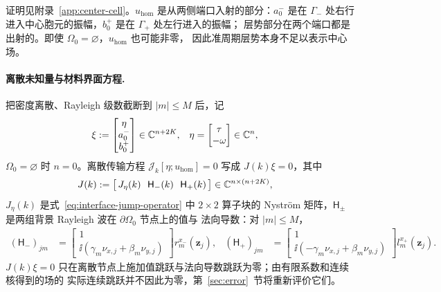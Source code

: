 证明见附录~\ref{app:center-cell}。$u_{\mathrm{hom}}$ 是从两侧端口入射的部分：$a^-_0$
是在 $\Gamma_-$ 处右行进入中心胞元的振幅，$b^+_0$ 是在 $\Gamma_+$ 处左行进入的振幅；
层势部分在两个端口都是出射的。即使 $\Omega_0=\varnothing$，$u_{\mathrm{hom}}$ 也可能非零，
因此准周期层势本身不足以表示中心场。

\paragraph{离散未知量与材料界面方程.}
把密度离散、Rayleigh 级数截断到 $|m|\leq M$ 后，记
\begin{align}
  \xi&:=\begin{bmatrix}\eta\\ a^-_0\\ b^+_0\end{bmatrix}\in\mathbb{C}^{n+2K},
  &\eta&=\begin{bmatrix}\tau\\-\omega\end{bmatrix}\in\mathbb{C}^n,
  \label{eq:center-unknown}
\end{align}
$\Omega_0=\varnothing$ 时 $n=0$。离散传输方程
$\mathscr J_k[\eta;u_{\mathrm{hom}}]=0$ 写成 $J(k)\xi=0$，其中
\begin{align}
  J(k)&:=\bigl[\,J_\eta(k)\ \ \mathsf H_-(k)\ \ \mathsf H_+(k)\,\bigr]
  \in\mathbb{C}^{n\times(n+2K)},
  \label{eq:center-interface-matrix}
\end{align}
$J_\eta(k)$ 是式~\eqref{eq:interface-jump-operator} 中 $2\times2$ 算子块的
Nystr\"om 矩阵，$\mathsf H_\pm$ 是两组背景 Rayleigh 波在 $\partial\Omega_0$ 节点上的值与
法向导数：对 $|m|\leq M$，
\begin{align}
  (\mathsf H_-)_{jm}
  &=\begin{bmatrix}1\\ \ii(\gamma_m\nu_{x,j}+\beta_m\nu_{y,j})\end{bmatrix}
    r_m^{x_-}(\mathbf z_j),
  &(\mathsf H_+)_{jm}
  &=\begin{bmatrix}1\\ \ii(-\gamma_m\nu_{x,j}+\beta_m\nu_{y,j})\end{bmatrix}
    l_m^{x_+}(\mathbf z_j).
  \label{eq:center-rayleigh-traces}
\end{align}
$J(k)\xi=0$ 只在离散节点上施加值跳跃与法向导数跳跃为零；由有限系数和连续核得到的场的
实际连续跳跃并不因此为零，第~\ref{sec:error}~节将重新评价它们。

